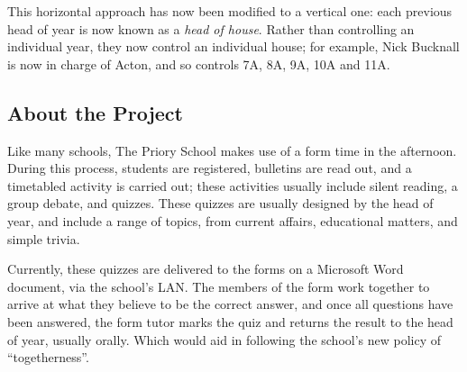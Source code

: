 This horizontal approach has now been modified to a vertical one: each previous head of year is now known as a \textit{head of house}. Rather than controlling an individual year, they now control an individual house; for example, Nick Bucknall is now in charge of Acton, and so controls 7A, 8A, 9A, 10A and 11A.

\subsection{About the Project}
Like many schools, The Priory School makes use of a form time in the afternoon. During this process, students are registered, bulletins are read out, and a timetabled activity is carried out; these activities usually include silent reading, a group debate, and quizzes. These quizzes are usually designed by the head of year, and include a range of topics, from current affairs, educational matters, and simple trivia.

Currently, these quizzes are delivered to the forms on a Microsoft Word document, via the school's LAN. The members of the form work together to arrive at what they believe to be the correct answer, and once all questions have been answered, the form tutor marks the quiz and returns the result to the head of year, usually orally. Which would aid in following the school's new policy of ``togetherness''.